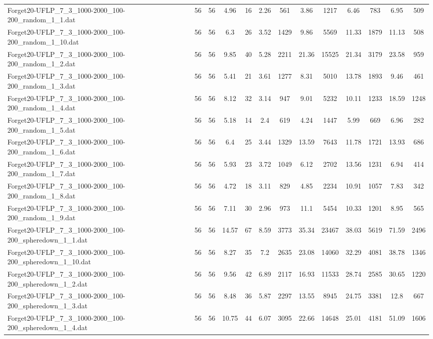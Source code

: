 \begin{table}[!ht]
{\begin{tabular}{lcccccccccccc}
Forget20-UFLP\_7\_3\_1000-2000\_100-200\_random\_1\_1.dat & 56 & 56 & 4.96 & 16 & 2.26 & 561 & 3.86 & 1217 & 6.46 & 783 & 6.95 & 509 \\
Forget20-UFLP\_7\_3\_1000-2000\_100-200\_random\_1\_10.dat & 56 & 56 & 6.3 & 26 & 3.52 & 1429 & 9.86 & 5569 & 11.33 & 1879 & 11.13 & 508 \\
Forget20-UFLP\_7\_3\_1000-2000\_100-200\_random\_1\_2.dat & 56 & 56 & 9.85 & 40 & 5.28 & 2211 & 21.36 & 15525 & 21.34 & 3179 & 23.58 & 959 \\
Forget20-UFLP\_7\_3\_1000-2000\_100-200\_random\_1\_3.dat & 56 & 56 & 5.41 & 21 & 3.61 & 1277 & 8.31 & 5010 & 13.78 & 1893 & 9.46 & 461 \\
Forget20-UFLP\_7\_3\_1000-2000\_100-200\_random\_1\_4.dat & 56 & 56 & 8.12 & 32 & 3.14 & 947 & 9.01 & 5232 & 10.11 & 1233 & 18.59 & 1248 \\
Forget20-UFLP\_7\_3\_1000-2000\_100-200\_random\_1\_5.dat & 56 & 56 & 5.18 & 14 & 2.4 & 619 & 4.24 & 1447 & 5.99 & 669 & 6.96 & 282 \\
Forget20-UFLP\_7\_3\_1000-2000\_100-200\_random\_1\_6.dat & 56 & 56 & 6.4 & 25 & 3.44 & 1329 & 13.59 & 7643 & 11.78 & 1721 & 13.93 & 686 \\
Forget20-UFLP\_7\_3\_1000-2000\_100-200\_random\_1\_7.dat & 56 & 56 & 5.93 & 23 & 3.72 & 1049 & 6.12 & 2702 & 13.56 & 1231 & 6.94 & 414 \\
Forget20-UFLP\_7\_3\_1000-2000\_100-200\_random\_1\_8.dat & 56 & 56 & 4.72 & 18 & 3.11 & 829 & 4.85 & 2234 & 10.91 & 1057 & 7.83 & 342 \\
Forget20-UFLP\_7\_3\_1000-2000\_100-200\_random\_1\_9.dat & 56 & 56 & 7.11 & 30 & 2.96 & 973 & 11.1 & 5454 & 10.33 & 1201 & 8.95 & 565 \\
Forget20-UFLP\_7\_3\_1000-2000\_100-200\_spheredown\_1\_1.dat & 56 & 56 & 14.57 & 67 & 8.59 & 3773 & 35.34 & 23467 & 38.03 & 5619 & 71.59 & 2496 \\
Forget20-UFLP\_7\_3\_1000-2000\_100-200\_spheredown\_1\_10.dat & 56 & 56 & 8.27 & 35 & 7.2 & 2635 & 23.08 & 14060 & 32.29 & 4081 & 38.78 & 1346 \\
Forget20-UFLP\_7\_3\_1000-2000\_100-200\_spheredown\_1\_2.dat & 56 & 56 & 9.56 & 42 & 6.89 & 2117 & 16.93 & 11533 & 28.74 & 2585 & 30.65 & 1220 \\
Forget20-UFLP\_7\_3\_1000-2000\_100-200\_spheredown\_1\_3.dat & 56 & 56 & 8.48 & 36 & 5.87 & 2297 & 13.55 & 8945 & 24.75 & 3381 & 12.8 & 667 \\
Forget20-UFLP\_7\_3\_1000-2000\_100-200\_spheredown\_1\_4.dat & 56 & 56 & 10.75 & 44 & 6.07 & 3095 & 22.66 & 14648 & 25.01 & 4181 & 51.09 & 1606 \\

\end{tabular}}
\end{table}
